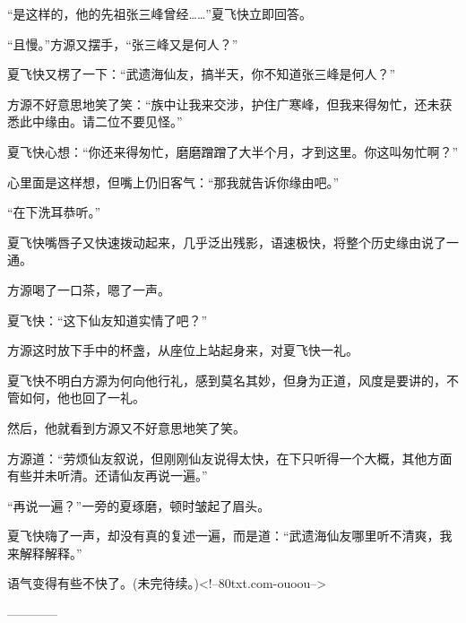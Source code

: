 \begin{this_body}
“是这样的，他的先祖张三峰曾经……”夏飞快立即回答。

“且慢。”方源又摆手，“张三峰又是何人？”

夏飞快又楞了一下：“武遗海仙友，搞半天，你不知道张三峰是何人？”

方源不好意思地笑了笑：“族中让我来交涉，护住广寒峰，但我来得匆忙，还未获悉此中缘由。请二位不要见怪。”

夏飞快心想：“你还来得匆忙，磨磨蹭蹭了大半个月，才到这里。你这叫匆忙啊？”

心里面是这样想，但嘴上仍旧客气：“那我就告诉你缘由吧。”

“在下洗耳恭听。”

夏飞快嘴唇子又快速拨动起来，几乎泛出残影，语速极快，将整个历史缘由说了一通。

方源喝了一口茶，嗯了一声。

夏飞快：“这下仙友知道实情了吧？”

方源这时放下手中的杯盏，从座位上站起身来，对夏飞快一礼。

夏飞快不明白方源为何向他行礼，感到莫名其妙，但身为正道，风度是要讲的，不管如何，他也回了一礼。

然后，他就看到方源又不好意思地笑了笑。

方源道：“劳烦仙友叙说，但刚刚仙友说得太快，在下只听得一个大概，其他方面有些并未听清。还请仙友再说一遍。”

“再说一遍？”一旁的夏琢磨，顿时皱起了眉头。

夏飞快嗨了一声，却没有真的复述一遍，而是道：“武遗海仙友哪里听不清爽，我来解释解释。”

语气变得有些不快了。(未完待续。)<!--80txt.com-ouoou-->

------------

\end{this_body}

